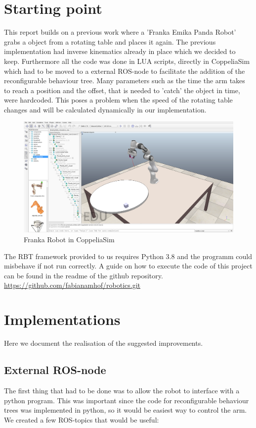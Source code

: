 \documentclass[report]{iisthesis}
\begin{document}
\setcounter{chapter}{1}
\setcounter{section}{0}
\chapter{Starting point}
This report builds on a previous work where a 'Franka Emika Panda Robot' grabs a object from a rotating table and places it again.
The previous implementation had inverse kinematics already in place which we decided to keep. Furthermore all the code was done in LUA scripts, directly in CoppeliaSim which had to be moved to a external ROS-node to facilitate the addition of the reconfigurable behaviour tree.
Many parameters such as the time the arm takes to reach a position and the offset, that is needed to 'catch' the object in time, were hardcoded. This poses a problem when the speed of the rotating table changes and will be calculated dynamically in our implementation.\\

\begin{figure}[h]
    \caption{Franka Robot in CoppeliaSim}
    \includegraphics[width=\textwidth]{arm_coppeliaSim}
\end{figure}
\noindent
The RBT framework provided to us requires Python 3.8 and the programm could misbehave if not run correctly.
A guide on how to execute the code of this project can be found in the readme of the github repository. \\ 
\url{https://github.com/fabianamhof/robotics.git}

\setcounter{chapter}{2}
\setcounter{section}{0}
\chapter{Implementations}
Here we document the realisation of the suggested improvements.

\section{External ROS-node}
The first thing that had to be done was to allow the robot to interface with a python program.
This was important since the code for reconfigurable behaviour trees was implemented in python, so it would be easiest way to control the 
arm.
We created a few ROS-topics that would be useful:
\end{document}
